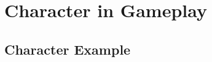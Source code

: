 \documentclass{LegrandOrangeTufteBook}
\begin{document}



\section*{Character in Gameplay}

\subsection*{Character Example}







\end{document}
